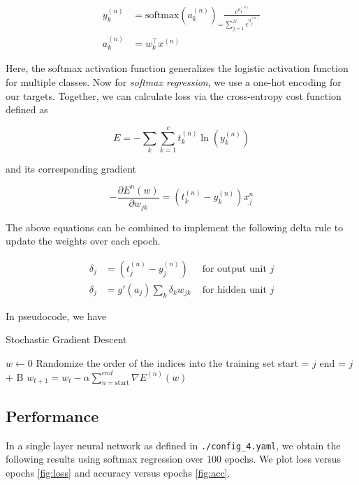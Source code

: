 \begin{equation*}
	\begin{aligned}
		y^{(n)}_k & = \text{softmax}(a^{(n)}_k)_ =
		\frac{e^{a^{(n)}_k}}{\sum_{j=1}^{N} e^{a^{(n)}_j}} \\
		a^{(n)}_k & = w^\top_k x^{(n)}
	\end{aligned}
\end{equation*}

Here, the softmax activation function generalizes the logistic activation
function for multiple classes. Now for \textit{softmax regression}, we use a
one-hot encoding for our targets. Together, we can calculate loss via the
cross-entropy cost function defined as

\begin{equation*}
	E = - \sum_k \sum_{k = 1}^c t^{(n)}_k \ln \left( y^{(n)}_k \right)
\end{equation*}

and its corresponding gradient

\begin{equation*}
	-\frac{\partial E^n(w)}{\partial w_{j k}}=\left(t_k^{(n)}-y_k^{(n)}\right) x_j^n
\end{equation*}

The above equations can be combined to implement the following delta rule to
update the weights over each epoch.

\begin{equation*}
	\begin{aligned}
		\delta_j & = (t_j^{(n)}-y_j^{(n)})         & \text{ for output unit } j \\
		\delta_j & = g'(a_j)\sum_k \delta_k w_{jk} & \text{ for hidden unit } j
	\end{aligned}
\end{equation*}

In pseudocode, we have

\begin{algorithm}
	\caption{Stochastic Gradient Descent}
	\begin{algorithmic}
		\State $w \gets 0$
		\State Randomize the order of the indices into the training set
		\State start = $j$
		\State end = $j$ + B
		\State $w_{t + 1} = w_t - \alpha \sum_{n = \text{start}}^{end} \nabla
			E^{(n)}(w) $
		\EndFor
		\EndFor
	\end{algorithmic}
\end{algorithm}

\subsection{Performance}

In a single layer neural network as defined in \texttt{./config\_4.yaml}, we
obtain the following results using softmax regression over 100 epochs. We
plot loss versus epochs \cref{fig:loss} and accuracy versus epochs \cref{fig:acc}.

